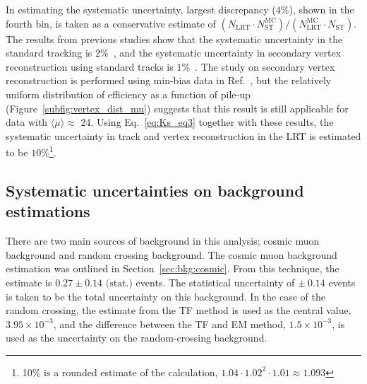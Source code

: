 In estimating the systematic uncertainty, largest discrepancy ($4\%$), shown in the fourth bin, is taken as a conservative estimate of $(N_{\mathrm{LRT}} \cdot N_{\mathrm{ST}}^{\mathrm{MC}}) / (N_{\mathrm{LRT}}^{\mathrm{MC}} \cdot N_{\mathrm{ST}})$. The results from previous studies show that the systematic uncertainty in the standard tracking is $2\%$~\cite{ATL-PHYS-PUB-2015-051}, and the systematic uncertainty in secondary vertex reconstruction using standard tracks is $1\%$~\cite{Aaboud:2215485}. The study on secondary vertex reconstruction is performed using min-bias data in Ref.~\cite{Aaboud:2215485}, but the relatively uniform distribution of efficiency as a function of pile-up (Figure~\ref{subfig:vertex_dist_mu}) suggests that this result is still applicable for data with $\langle \mu \rangle\approx$ 24. Using Eq.~\ref{eq:Ks_eq3} together with these results, the systematic uncertainty in track and vertex reconstruction in the LRT is estimated to be $10\%$\footnote{10\% is a rounded estimate of the calculation, $1.04\cdot1.02^{2}\cdot1.01\approx1.093$}.


%
%
%

\subsection{Systematic uncertainties on background estimations}
\label{sec:syst_bkg}

There are two main sources of background in this analysis; cosmic muon background and random crossing background. The cosmic muon background estimation was outlined in Section~\ref{sec:bkg:cosmic}. From this technique, the estimate is $0.27 \pm 0.14 \textrm{ (stat.)}$ events. The statistical uncertainty of $\pm~0.14$ events is taken to be the total uncertainty on this background. In the case of the random crossing, the estimate from the TF method is used as the central value, $3.95 \times 10^{-3}$, and the difference between the TF and EM method, $1.5\times10^{-3}$, is used as the uncertainty on the random-crossing background.












